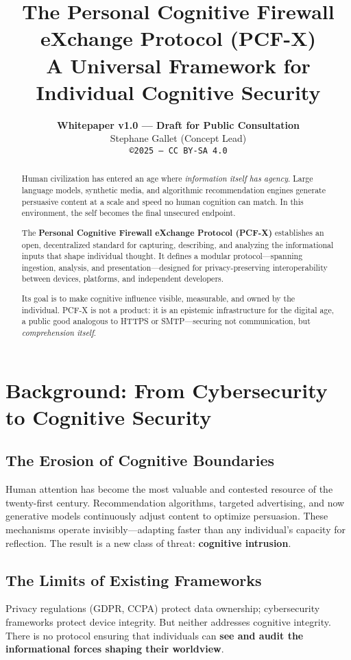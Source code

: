 \documentclass[12pt]{article}
\title{\textbf{The Personal Cognitive Firewall eXchange Protocol (PCF-X)}\\
\vspace{0.3em}
\large A Universal Framework for Individual Cognitive Security}
\author{
\textbf{Whitepaper v1.0 — Draft for Public Consultation}\\[1em]
Stephane Gallet (Concept Lead)\\
\texttt{©2025 — CC BY-SA 4.0}
}
\date{}
\begin{document}
\maketitle
\begin{abstract}
Human civilization has entered an age where \textit{information itself has agency}.  
Large language models, synthetic media, and algorithmic recommendation engines generate persuasive content at a scale and speed no human cognition can match.  
In this environment, the self becomes the final unsecured endpoint.

The \textbf{Personal Cognitive Firewall eXchange Protocol (PCF-X)} establishes an open, decentralized standard for capturing, describing, and analyzing the informational inputs that shape individual thought.  
It defines a modular protocol—spanning ingestion, analysis, and presentation—designed for privacy-preserving interoperability between devices, platforms, and independent developers.

Its goal is to make cognitive influence visible, measurable, and owned by the individual.  
PCF-X is not a product: it is an epistemic infrastructure for the digital age, a public good analogous to HTTPS or SMTP—securing not communication, but \textit{comprehension itself}.
\end{abstract}

\section{Background: From Cybersecurity to Cognitive Security}

\subsection{The Erosion of Cognitive Boundaries}
Human attention has become the most valuable and contested resource of the twenty-first century.  
Recommendation algorithms, targeted advertising, and now generative models continuously adjust content to optimize persuasion.  
These mechanisms operate invisibly—adapting faster than any individual’s capacity for reflection.  
The result is a new class of threat: \textbf{cognitive intrusion}.

\subsection{The Limits of Existing Frameworks}
Privacy regulations (GDPR, CCPA) protect data ownership; cybersecurity frameworks protect device integrity.  
But neither addresses cognitive integrity.  
There is no protocol ensuring that individuals can \textbf{see and audit the informational forces shaping their worldview}.
\end{document}
